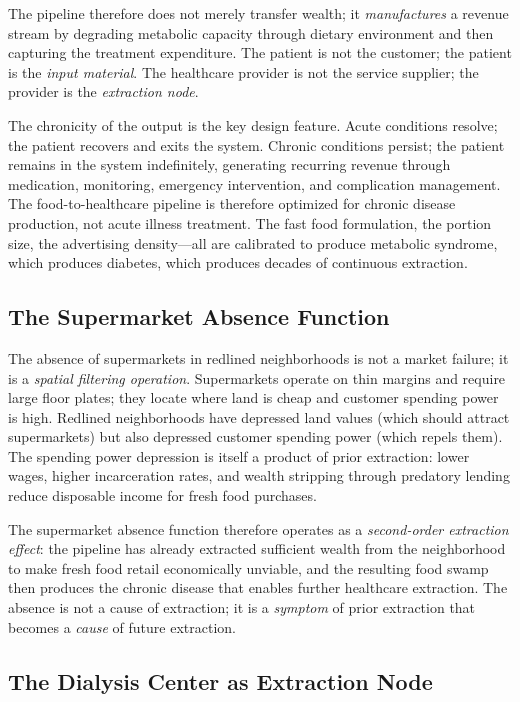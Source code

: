 The pipeline therefore does not merely transfer wealth; it \textit{manufactures} a revenue stream by degrading metabolic capacity through dietary environment and then capturing the treatment expenditure. The patient is not the customer; the patient is the \textit{input material}. The healthcare provider is not the service supplier; the provider is the \textit{extraction node}.

The chronicity of the output is the key design feature. Acute conditions resolve; the patient recovers and exits the system. Chronic conditions persist; the patient remains in the system indefinitely, generating recurring revenue through medication, monitoring, emergency intervention, and complication management. The food-to-healthcare pipeline is therefore optimized for chronic disease production, not acute illness treatment. The fast food formulation, the portion size, the advertising density---all are calibrated to produce metabolic syndrome, which produces diabetes, which produces decades of continuous extraction.

\subsection{The Supermarket Absence Function}

The absence of supermarkets in redlined neighborhoods is not a market failure; it is a \textit{spatial filtering operation}. Supermarkets operate on thin margins and require large floor plates; they locate where land is cheap and customer spending power is high. Redlined neighborhoods have depressed land values (which should attract supermarkets) but also depressed customer spending power (which repels them). The spending power depression is itself a product of prior extraction: lower wages, higher incarceration rates, and wealth stripping through predatory lending reduce disposable income for fresh food purchases.

The supermarket absence function therefore operates as a \textit{second-order extraction effect}: the pipeline has already extracted sufficient wealth from the neighborhood to make fresh food retail economically unviable, and the resulting food swamp then produces the chronic disease that enables further healthcare extraction. The absence is not a cause of extraction; it is a \textit{symptom} of prior extraction that becomes a \textit{cause} of future extraction.

\subsection{The Dialysis Center as Extraction Node}

